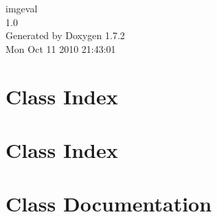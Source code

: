 \documentclass[a4paper]{book}
\begin{document}
\hypersetup{pageanchor=false}
\begin{titlepage}
\vspace*{7cm}
\begin{center}
{\Large imgeval \\[1ex]\large 1.0 }\\
\vspace*{1cm}
{\large Generated by Doxygen 1.7.2}\\
\vspace*{0.5cm}
{\small Mon Oct 11 2010 21:43:01}\\
\end{center}
\end{titlepage}
\clearemptydoublepage
{}
\tableofcontents
\clearemptydoublepage
{}
\hypersetup{pageanchor=true}
\chapter{Class Index}

\chapter{Class Index}

\chapter{Class Documentation}







































\printindex
\end{document}
